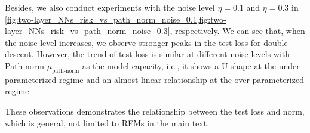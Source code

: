 Besides, we also conduct experiments with the noise level \(\eta=0.1\) and \(\eta=0.3\) in
\cref{fig:two-layer_NNs_risk_vs_path_norm_noise_0.1,fig:two-layer_NNs_risk_vs_path_norm_noise_0.3}, respectively. 
We can see that, when the noise level increases, we observe stronger peaks in the test loss for double descent. However, the trend of test loss is similar at different noise levels with Path norm \(\mu_{\text{path-norm}}\) as the model capacity, i.e., it shows a U-shape at the under-parameterized regime and an almost linear relationship at the over-parameterized regime.

These observations demonstrates the relationship between the test loss and norm, which is general, not limited to RFMs in the main text.


